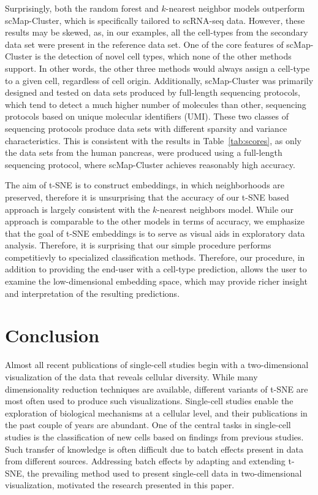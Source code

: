 \documentclass[runningheads]{llncs}
\begin{document}
Surprisingly, both the random forest and $k$-nearest neighbor models outperform
scMap-Cluster, which is specifically tailored to scRNA-seq data. However, these
results may be skewed, as, in our examples, all the cell-types from the
secondary data set were present in the reference data set. One of the core
features of scMap-Cluster is the detection of novel cell types, which none of
the other methods support. In other words, the other three methods would always
assign a cell-type to a given cell, regardless of cell origin. Additionally,
scMap-Cluster was primarily designed and tested on data sets produced by
full-length sequencing protocols, which tend to detect a much higher number of
molecules than other, sequencing protocols based on unique molecular identifiers
(UMI). These two classes of sequencing protocols produce data sets with
different sparsity and variance characteristics. This is consistent with the
results in Table~\ref{tab:scores}, as only the data sets from the human
pancreas, were produced using a full-length sequencing protocol, where
scMap-Cluster achieves reasonably high accuracy.

The aim of t-SNE is to construct embeddings, in which neighborhoods are
preserved, therefore it is unsurprising that the accuracy of our t-SNE based
approach is largely consistent with the $k$-nearest neighbors model. While our
approach is comparable to the other models in terms of accuracy, we emphasize
that the goal of t-SNE embeddings is to serve as visual aids in exploratory data
analysis. Therefore, it is surprising that our simple procedure performs
competitievly to specialized classification methods. Therefore, our procedure,
in addition to providing the end-user with a cell-type prediction, allows the
user to examine the low-dimensional embedding space, which may provide richer
insight and interpretation of the resulting predictions.

\section{Conclusion}

Almost all recent publications of single-cell studies begin with a
two-dimensional visualization of the data that reveals cellular diversity. While
many dimensionality reduction techniques are available, different  variants of
t-SNE are most often used to produce such visualizations. Single-cell studies
enable the exploration of biological mechanisms at a cellular level, and their
publications in the past couple of years are abundant. One of the central tasks
in single-cell studies is the classification of new cells based on findings from
previous studies. Such transfer of knowledge is often difficult due to batch
effects present in data from different sources. Addressing batch effects by
adapting and extending t-SNE, the prevailing method used to present single-cell
data in two-dimensional visualization, motivated the research presented in this
paper.
\end{document}
